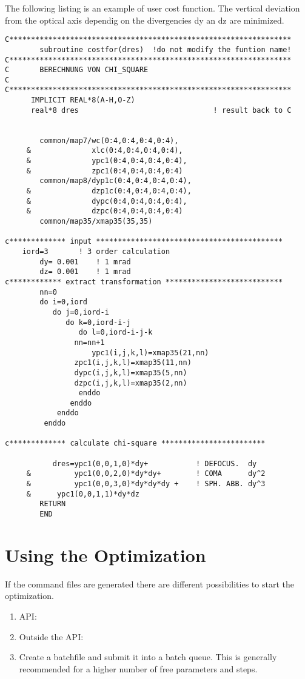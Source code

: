 The following listing is an example of user cost function. 
The vertical deviation from the optical axis
dependig on the divergencies dy an dz are minimized.
\begin{small}
\begin{verbatim}
C*****************************************************************
        subroutine costfor(dres)  !do not modify the funtion name!
C*****************************************************************
C       BERECHNUNG VON CHI_SQUARE
C
C*****************************************************************
      IMPLICIT REAL*8(A-H,O-Z)
      real*8 dres                               ! result back to C     

      
        common/map7/wc(0:4,0:4,0:4,0:4),
     &              xlc(0:4,0:4,0:4,0:4),
     &              ypc1(0:4,0:4,0:4,0:4),
     &              zpc1(0:4,0:4,0:4,0:4)
        common/map8/dyp1c(0:4,0:4,0:4,0:4),
     &              dzp1c(0:4,0:4,0:4,0:4),
     &              dypc(0:4,0:4,0:4,0:4),
     &              dzpc(0:4,0:4,0:4,0:4)
        common/map35/xmap35(35,35)

c************* input *******************************************
	iord=3       ! 3 order calculation
        dy= 0.001    ! 1 mrad
        dz= 0.001    ! 1 mrad
c************ extract transformation ***************************
        nn=0
        do i=0,iord
           do j=0,iord-i
              do k=0,iord-i-j
                 do l=0,iord-i-j-k
	            nn=nn+1
                    ypc1(i,j,k,l)=xmap35(21,nn)
         	    zpc1(i,j,k,l)=xmap35(11,nn)
         	    dypc(i,j,k,l)=xmap35(5,nn)
         	    dzpc(i,j,k,l)=xmap35(2,nn)
                 enddo
               enddo        
       	    enddo
       	 enddo        

c************* calculate chi-square ************************

           dres=ypc1(0,0,1,0)*dy+     	    ! DEFOCUS.  dy
     &	        ypc1(0,0,2,0)*dy*dy+        ! COMA      dy^2
     &	        ypc1(0,0,3,0)*dy*dy*dy +    ! SPH. ABB. dy^3
     &		ypc1(0,0,1,1)*dy*dz                   
        RETURN
        END

\end{verbatim}   
\end{small}

\section {Using the Optimization}
If the command files are generated there are different possibilities to start
the optimization.
\begin {enumerate} 
\item  \phase API: 
\item Outside the API:   
\item Create a batchfile and submit it into a batch queue. This is generally 
recommended for a higher number of free parameters and steps.  
\end {enumerate}       

